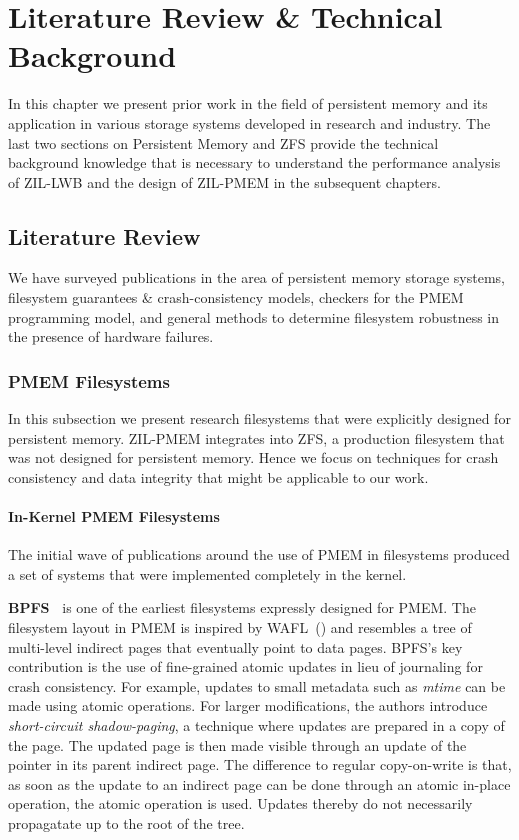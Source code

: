 \documentclass[12pt,a4paper,twoside]{book}
\begin{document}
\chapter{Literature Review \& Technical Background}\label{ch:litreviewandbackground}
In this chapter we present prior work in the field of persistent memory and its application in various storage systems developed in research and industry.
The last two sections on Persistent Memory and ZFS provide the technical background knowledge that is necessary to understand the performance analysis of ZIL-LWB and the design of ZIL-PMEM in the subsequent chapters.

\section{Literature Review}
We have surveyed publications in the area of persistent memory storage systems, filesystem guarantees \& crash-consistency models, checkers for the PMEM programming model, and general methods to determine filesystem robustness in the presence of hardware failures.

\subsection{PMEM Filesystems}
In this subsection we present research filesystems that were explicitly designed for persistent memory.
ZIL-PMEM integrates into ZFS, a production filesystem that was not designed for persistent memory.
Hence we focus on techniques for crash consistency and data integrity that might be applicable to our work.

\subsubsection{In-Kernel PMEM Filesystems}\label{sec:in_kernel_pmem_filesystems}
The initial wave of publications around the use of PMEM in filesystems produced a set of systems that were implemented completely in the kernel.

\newcommand{\citerelwork}[2]{\textbf{#1~\cite{#2}}}

\citerelwork{BPFS}{conditBetterByteaddressablePersistent2009} is one of the earliest filesystems expressly designed for PMEM.
The filesystem layout in PMEM is inspired by WAFL~(\cite{hitzFileSystemDesign1994}) and resembles a tree of multi-level indirect pages that eventually point to data pages.
BPFS’s key contribution is the use of fine-grained atomic updates in lieu of journaling for crash consistency.
For example, updates to small metadata such as \textit{mtime} can be made using atomic operations.
For larger modifications, the authors introduce \textit{short-circuit shadow-paging}, a technique where updates are prepared in a copy of the page.
The updated page is then made visible through an update of the pointer in its parent indirect page.
The difference to regular copy-on-write is that, as soon as the update to an indirect page can be done through an atomic in-place operation, the atomic operation is used.
Updates thereby do not necessarily propagatate up to the root of the tree.
\end{document}
